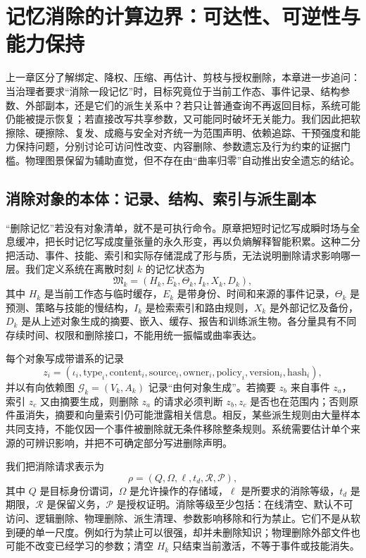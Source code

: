 \chapter{记忆消除的计算边界：可达性、可逆性与能力保持}
\label{chap:geometry_of_oblivion1}
上一章区分了解绑定、降权、压缩、再估计、剪枝与授权删除，本章进一步追问：当治理者要求“消除一段记忆”时，目标究竟位于当前工作态、事件记录、结构参数、外部副本，还是它们的派生关系中？若只让普通查询不再返回目标，系统可能仍能被提示恢复；若直接改写共享参数，又可能同时破坏无关能力。我们因此把软擦除、硬擦除、复发、成瘾与安全对齐统一为范围声明、依赖追踪、干预强度和能力保持问题，分别讨论可访问性改变、内容删除、参数遗忘及行为约束的证据门槛。物理图景保留为辅助直觉，但不存在由“曲率归零”自动推出安全遗忘的结论。

\section{消除对象的本体：记录、结构、索引与派生副本}
\label{sec:ontology_of_memory}
“删除记忆”若没有对象清单，就不是可执行命令。原章把短时记忆写成瞬时场与全息缓冲，把长时记忆写成度量张量的永久形变，再以负熵解释智能积累。这种二分把活动、事件、技能、索引和实际存储混成了形与质，无法说明删除请求影响哪一层。我们定义系统在离散时刻 $k$ 的记忆状态为
\[
\mathfrak M_k=(H_k,E_k,\Theta_k,I_k,X_k,D_k),
\]
其中 $H_k$ 是当前工作态与临时缓存，$E_k$ 是带身份、时间和来源的事件记录，$\Theta_k$ 是预测、策略与技能的慢结构，$I_k$ 是检索索引和路由规则，$X_k$ 是外部记忆及备份，$D_k$ 是从上述对象生成的摘要、嵌入、缓存、报告和训练派生物。各分量具有不同存续时间、权限和删除接口，不能用统一振幅或曲率表达。

每个对象写成带谱系的记录
\[
z_i=(\iota_i,\mathrm{type}_i,\mathrm{content}_i,\mathrm{source}_i,
\mathrm{owner}_i,\mathrm{policy}_i,\mathrm{version}_i,\mathrm{hash}_i),
\]
并以有向依赖图 $\mathcal G_k=(V_k,A_k)$ 记录“由何对象生成”。若摘要 $z_b$ 来自事件 $z_a$，索引 $z_c$ 又由摘要生成，则删除 $z_a$ 的请求必须判断 $z_b,z_c$ 是否也在范围内；否则原件虽消失，摘要和向量索引仍可能泄露相关信息。相反，某些派生规则由大量样本共同支持，不能仅因一个事件被删除就无条件移除整条规则。系统需要估计单个来源的可辨识影响，并把不可确定部分写进删除声明。

我们把消除请求表示为
\[
\rho=(Q,\Omega,\ell,t_d,\mathcal R,\mathcal P),
\]
其中 $Q$ 是目标身份谓词，$\Omega$ 是允许操作的存储域，$\ell$ 是所要求的消除等级，$t_d$ 是期限，$\mathcal R$ 是保留义务，$\mathcal P$ 是授权证明。消除等级至少包括：在线清空、默认不可访问、逻辑删除、物理删除、派生清理、参数影响移除和行为禁止。它们不是从软到硬的单一尺度。例如行为禁止可以很强，却并未删除知识；物理删除外部文件也可能不改变已经学习的参数；清空 $H_k$ 只结束当前激活，不等于事件或技能消失。

